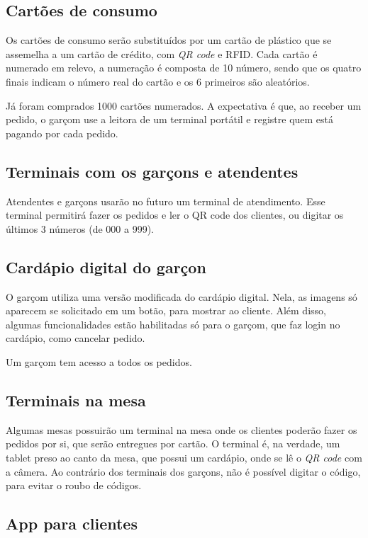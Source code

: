 \subsection{Cartões de consumo}

Os cartões de consumo serão substituídos por um cartão de plástico que se assemelha a um cartão de crédito, com \textit{QR code} e RFID. Cada cartão é numerado em relevo, a numeração é composta de 10 número, sendo que os quatro finais indicam o número real do cartão e os 6 primeiros são aleatórios.

Já foram comprados 1000 cartões numerados. A expectativa é que, ao receber um pedido, o garçom use a leitora de um terminal portátil e registre quem está pagando por cada pedido. 


\subsection{Terminais com os garçons e atendentes}

Atendentes e garçons usarão no futuro um terminal de atendimento. Esse terminal permitirá fazer os pedidos e ler o QR code dos clientes, ou digitar os últimos 3 números (de 000 a 999). 

\subsection{Cardápio digital do garçon}

O garçom utiliza uma versão modificada do cardápio digital. Nela, as imagens só aparecem se solicitado em um botão, para mostrar ao cliente. Além disso, algumas funcionalidades estão habilitadas só para o garçom, que faz login no cardápio, como cancelar pedido.

Um garçom tem acesso a todos os pedidos.


\subsection{Terminais na mesa}

Algumas mesas possuirão um terminal na mesa onde os clientes poderão fazer os pedidos por si, que serão entregues por cartão. O terminal é, na verdade, um tablet preso ao canto da mesa, que possui um cardápio, onde se lê o \textit{QR code} com a câmera. Ao contrário dos terminais dos garçons, não é possível digitar o código, para evitar o roubo de códigos.

\subsection{App para clientes}


